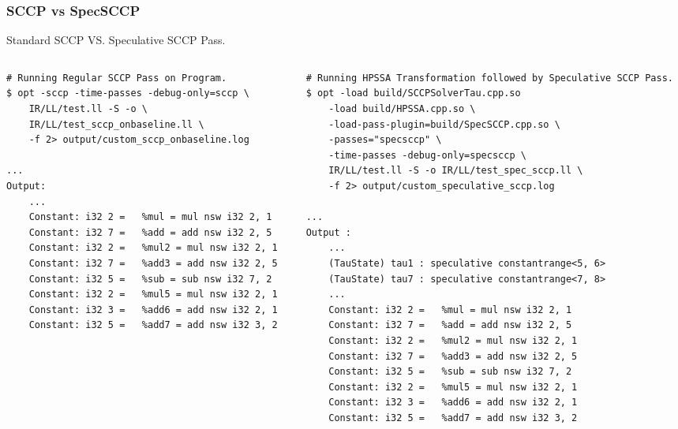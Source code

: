 \documentclass[aspectratio=169, compress]{beamer}
\begin{document}
\begin{frame}[fragile]
	\frametitle{SCCP vs SpecSCCP}
	Standard SCCP VS. Speculative SCCP Pass.
\begin{columns}
	\begin{column}{0.4\textwidth}
		\begin{verbatim}
# Running Regular SCCP Pass on Program.
$ opt -sccp -time-passes -debug-only=sccp \
	IR/LL/test.ll -S -o \
	IR/LL/test_sccp_onbaseline.ll \
	-f 2> output/custom_sccp_onbaseline.log

...
Output:
	...
	Constant: i32 2 =   %mul = mul nsw i32 2, 1
	Constant: i32 7 =   %add = add nsw i32 2, 5
	Constant: i32 2 =   %mul2 = mul nsw i32 2, 1
	Constant: i32 7 =   %add3 = add nsw i32 2, 5
	Constant: i32 5 =   %sub = sub nsw i32 7, 2
	Constant: i32 2 =   %mul5 = mul nsw i32 2, 1
	Constant: i32 3 =   %add6 = add nsw i32 2, 1
	Constant: i32 5 =   %add7 = add nsw i32 3, 2
		\end{verbatim}
	\end{column}
	\begin{column}{0.5\textwidth}  
		\begin{verbatim}
# Running HPSSA Transformation followed by Speculative SCCP Pass.
$ opt -load build/SCCPSolverTau.cpp.so 
	-load build/HPSSA.cpp.so \
	-load-pass-plugin=build/SpecSCCP.cpp.so \
	-passes="specsccp" \
	-time-passes -debug-only=specsccp \
	IR/LL/test.ll -S -o IR/LL/test_spec_sccp.ll \
	-f 2> output/custom_speculative_sccp.log
	
...
Output :
	...
	(TauState) tau1 : speculative constantrange<5, 6> 
	(TauState) tau7 : speculative constantrange<7, 8> 
	...
	Constant: i32 2 =   %mul = mul nsw i32 2, 1
	Constant: i32 7 =   %add = add nsw i32 2, 5
	Constant: i32 2 =   %mul2 = mul nsw i32 2, 1
	Constant: i32 7 =   %add3 = add nsw i32 2, 5
	Constant: i32 5 =   %sub = sub nsw i32 7, 2
	Constant: i32 2 =   %mul5 = mul nsw i32 2, 1
	Constant: i32 3 =   %add6 = add nsw i32 2, 1
	Constant: i32 5 =   %add7 = add nsw i32 3, 2
		\end{verbatim}
	\end{column}
\end{columns}
\end{frame}
\end{document}

